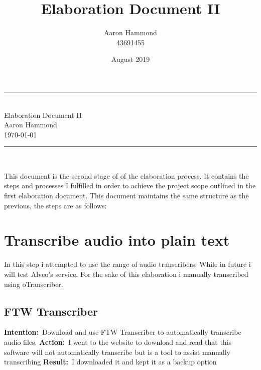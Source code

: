 \documentclass{article}
\title{Elaboration Document II}
\author{Aaron Hammond\\43691455}
\date{August 2019}
\newcommand\HRule{\rule{\textwidth}{1pt}} %
\newcommand{\intention}[1]{\noindent \textbf{Intention:}{\textnormal\ #1} \newline}
\newcommand{\action}[1]{\textbf{Action:}{\textnormal\ #1} \newline}
\newcommand{\result}[1]{\textbf{Result:}{\textnormal\ #1} \newline}
\begin{document}

\begin{titlepage}


\begin{center}
\HRule\\[0.4cm]
\huge{Elaboration Document II}\\[0.5cm]
\huge{Aaron Hammond}\\
\large{\today}\\[0.4cm]

\HRule \\[1cm]
\end{center}

\begin{justify}
\noindent This document is the second stage of of the elaboration process. It contains the steps and processes I fulfilled in order to achieve the project scope outlined in the first elaboration document. This document maintains the same structure as the previous, the steps are as follows:
\end{justify}


\def\contentsname{\empty} %
\tableofcontents

\end{titlepage}


\section{Transcribe audio into plain text}
In this step i attempted to use the range of audio transcribers. While in future i will test Alveo's service. For the sake of this elaboration i manually transcribed using oTranscriber.

\subsection{FTW Transcriber}
\intention{Download and use FTW Transcriber to automatically transcribe audio files.}
\action{I went to the website to download and read that this software will not automatically transcribe but is a tool to assist manually transcribing}
\result{I downloaded it and kept it as a backup option}
\end{document}
